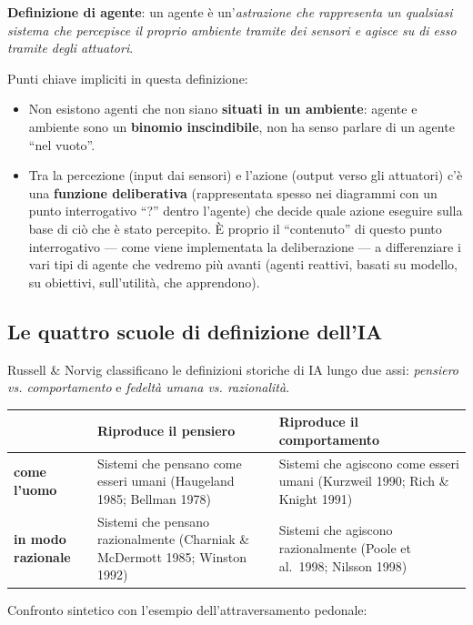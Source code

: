 \documentclass[11pt,a4paper]{report}
\begin{document}
\textbf{Definizione di agente}: un agente è un'\emph{astrazione che rappresenta un qualsiasi sistema che percepisce il proprio ambiente tramite dei sensori e agisce su di esso tramite degli attuatori}.

Punti chiave impliciti in questa definizione:
\begin{itemize}
  \item Non esistono agenti che non siano \textbf{situati in un ambiente}: agente e ambiente sono un \textbf{binomio inscindibile}, non ha senso parlare di un agente ``nel vuoto''.
  \item Tra la percezione (input dai sensori) e l'azione (output verso gli attuatori) c'è una \textbf{funzione deliberativa} (rappresentata spesso nei diagrammi con un punto interrogativo ``?'' dentro l'agente) che decide quale azione eseguire sulla base di ciò che è stato percepito. È proprio il ``contenuto'' di questo punto interrogativo --- come viene implementata la deliberazione --- a differenziare i vari tipi di agente che vedremo più avanti (agenti reattivi, basati su modello, su obiettivi, sull'utilità, che apprendono).
\end{itemize}

\subsection{Le quattro scuole di definizione dell'IA}

Russell \& Norvig classificano le definizioni storiche di IA lungo due assi: \emph{pensiero vs. comportamento} e \emph{fedeltà umana vs. razionalità}.

\begin{center}
\begin{tabular}{@{}p{2cm}p{5.7cm}p{5.7cm}@{}}
\toprule
 & \textbf{Riproduce il pensiero} & \textbf{Riproduce il comportamento} \\
\midrule
\textbf{come l'uomo} & Sistemi che pensano come esseri umani (Haugeland 1985; Bellman 1978) & Sistemi che agiscono come esseri umani (Kurzweil 1990; Rich \& Knight 1991) \\
\textbf{in modo razionale} & Sistemi che pensano razionalmente (Charniak \& McDermott 1985; Winston 1992) & Sistemi che agiscono razionalmente (Poole et al.\ 1998; Nilsson 1998) \\
\bottomrule
\end{tabular}
\end{center}

Confronto sintetico con l'esempio dell'attraversamento pedonale:
\end{document}
